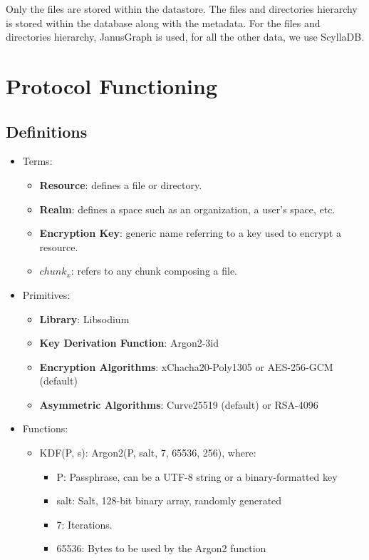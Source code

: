 \documentclass[a4paper,9pt,twoside]{article}
\begin{document}
    Only the files are stored within the datastore. The files and directories hierarchy is stored within the database 
along with the metadata. For the files and directories hierarchy, JanusGraph is used, for all the other data, 
we use ScyllaDB.

\section{Protocol Functioning}

\subsection{Definitions}

\begin{itemize}
\itemsep0em
\item {Terms}:
\begin{itemize}
\item \textbf{Resource}: defines a file or directory.
\item \textbf{Realm}: defines a space such as an organization, a user's space, etc.
\item \textbf{Encryption Key}: generic name referring to a key used to encrypt a resource.
\item \textbf{$chunk_x$}: refers to any chunk composing a file.
\end{itemize}
\item{Primitives}:
\begin{itemize}
\item \textbf{Library}: Libsodium
\item \textbf{Key Derivation Function}: Argon2-3id
\item \textbf{Encryption Algorithms}: xChacha20-Poly1305 or AES-256-GCM (default)
\item \textbf{Asymmetric Algorithms}: Curve25519 (default) or RSA-4096
\end{itemize}
\item Functions:
\begin{itemize}
\item KDF(P, s): Argon2(P, salt, 7, 65536, 256), where:
\begin{itemize} %
\item P: Passphrase, can be a UTF-8 string or a binary-formatted key
\item salt: Salt, 128-bit binary array, randomly generated
\item 7: Iterations.
\item 65536: Bytes to be used by the Argon2 function

\end{itemize}
\end{itemize}
\end{itemize}
\end{document}
